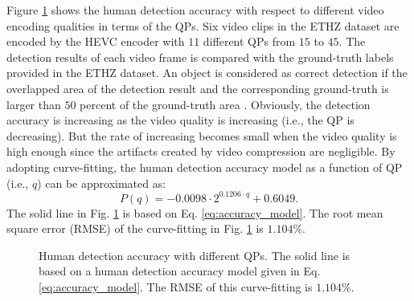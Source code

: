 \documentclass[journal]{IEEEtran}
\begin{document}
Figure \ref{fig:accuracy} shows the human detection accuracy with respect to different video encoding qualities in terms of the QPs. Six video clips in the ETHZ dataset \cite{ELSG08} are encoded by the HEVC encoder \cite{X265} with $11$ different QPs from $15$ to $45$. The detection results of each video frame is compared with the ground-truth labels provided in the ETHZ dataset. An object is considered as correct detection if the overlapped area of the detection result and the corresponding ground-truth is larger than $50$ percent of the ground-truth area \cite{FGMR10}. Obviously, the detection accuracy is increasing as the video quality is increasing (i.e., the QP is decreasing). But the rate of increasing becomes small when the video quality is high enough since the artifacts created by video compression are negligible. By adopting curve-fitting, the human detection accuracy model as a function of QP (i.e., $q$) can be approximated as:
\begin{equation}\label{eq:accuracy_model}
P\left(q\right) = -0.0098\cdot 2^{0.1206\cdot q}+0.6049.
\end{equation}
The solid line in Fig. \ref{fig:accuracy} is based on Eq. \eqref{eq:accuracy_model}. The root mean square error (RMSE) of the curve-fitting in Fig. \ref{fig:accuracy} is $1.104\%$.


\begin{figure}[t]
\caption{Human detection accuracy with different QPs. The solid line is based on a human detection accuracy model given in Eq. \eqref{eq:accuracy_model}. The RMSE of this curve-fitting is $1.104\%$.}\label{fig:accuracy}
\end{figure}
\end{document}

